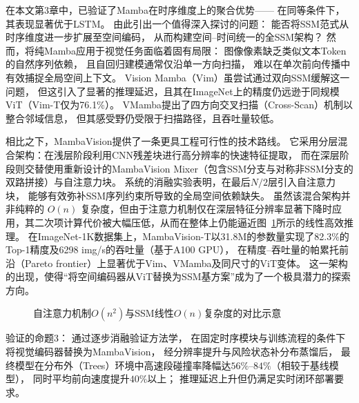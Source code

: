 在本文第3章中，已验证了Mamba在时序维度上的聚合优势——
在同等条件下，其表现显著优于LSTM。
由此引出一个值得深入探讨的问题：
能否将SSM范式从时序维度进一步扩展至空间编码，
从而构建空间--时间统一的全SSM架构？
然而，将纯Mamba应用于视觉任务面临着固有局限：
图像像素缺乏类似文本Token的自然序列依赖，
且自回归建模通常仅沿单一方向扫描，
难以在单次前向传播中有效捕捉全局空间上下文\cite{Zhu2024VisionMamba}。
Vision Mamba（Vim）\cite{Zhu2024VisionMamba}虽尝试通过双向SSM缓解这一问题，
但这引入了显著的推理延迟，且其在ImageNet上的精度仍远逊于同规模ViT（Vim-T仅为76.1\%）。
VMamba\cite{Liu2024VMamba}提出了四方向交叉扫描（Cross-Scan）机制以整合邻域信息，
但其感受野仍受限于扫描路径，且吞吐量较低。

相比之下，MambaVision\cite{Hatamizadeh2025MambaVisionCVPR}提供了一条更具工程可行性的技术路线。
它采用分层混合架构：在浅层阶段利用CNN残差块进行高分辨率的快速特征提取，
而在深层阶段则交替使用重新设计的MambaVision Mixer（包含SSM分支与对称非SSM分支的双路拼接）与自注意力块。
系统的消融实验表明，在最后$N/2$层引入自注意力块，
能够有效弥补SSM序列约束所导致的全局空间依赖缺失。
虽然该混合架构并非纯粹的 $O(n)$ 复杂度，但由于注意力机制仅在深层特征分辨率显著下降时应用，其二次项计算代价被大幅压低，从而在整体上仍能逼近图~\ref{fig:complexity_compare}所示的线性高效推理。
在ImageNet-1K数据集上，MambaVision-T以31.8M的参数量实现了82.3\%的Top-1精度及6298 img/s的吞吐量（基于A100 GPU），
在精度--吞吐量的帕累托前沿（Pareto frontier）上显著优于Vim、VMamba及同尺寸的ViT变体\cite{Hatamizadeh2025MambaVisionCVPR}。
这一架构的出现，使得“将空间编码器从ViT替换为SSM基方案”成为了一个极具潜力的探索方向。

\begin{figure}[htbp]
\centering
{}
\caption{自注意力机制$O(n^2)$与SSM线性$O(n)$复杂度的对比示意}
\label{fig:complexity_compare}
\end{figure}

验证的命题3：
通过逐步消融验证方法学，
在固定时序模块与训练流程的条件下将视觉编码器替换为MambaVision，
经分辨率提升与风险状态补分布蒸馏后，
最终模型在分布外（Trees）环境中高速段碰撞率降幅达$56\%$--$84\%$（相较于基线模型），
同时平均前向速度提升$40\%$以上；
推理延迟上升但仍满足实时闭环部署要求。


